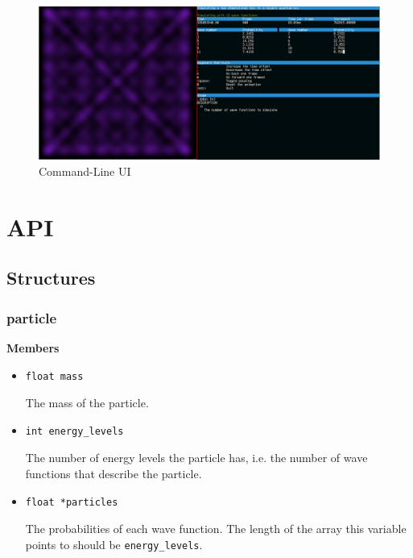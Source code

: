 \documentclass[a4paper, 10pt]{article}
\begin{document}
    \begin{figure}[hb]
        \centering
        \includegraphics[width=14cm]{graphics/cmdui.png}
        \caption{Command-Line UI}
    \end{figure}


\newpage
\section{API}
    \subsection{Structures}
        \subsubsection{particle}
        {\bf Members}
        \begin{itemize}
            \item \begin{verbatim}float mass\end{verbatim} The mass of the particle.
            \item \begin{verbatim}int energy_levels\end{verbatim} The number
                  of energy levels the particle has, i.e. the number of wave
                  functions that describe the particle.
            \item \begin{verbatim}float *particles\end{verbatim} The
                  probabilities of each wave function. The length of the array
                  this variable points to should be \verb|energy_levels|.
        \end{itemize}

    \vspace{1cm}
\end{document}

